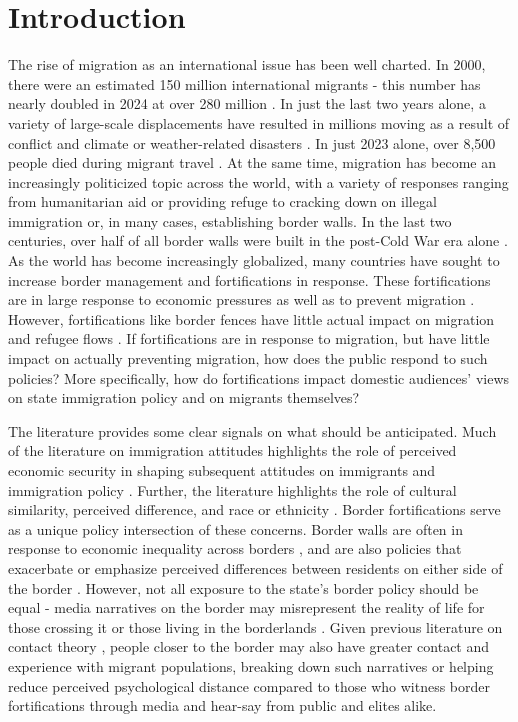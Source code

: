 \documentclass[12pt,]{article}
\begin{document}
\vskip 6.5pt


\noindent \doublespacing \section{Introduction}\label{introduction}

The rise of migration as an international issue has been well charted.
In 2000, there were an estimated 150 million international migrants -
this number has nearly doubled in 2024 at over 280 million
\citep{mcauliffe2024}. In just the last two years alone, a variety of
large-scale displacements have resulted in millions moving as a result
of conflict and climate or weather-related disasters
\citep{mcauliffe2024}. In just 2023 alone, over 8,500 people died during
migrant travel \citep{mcauliffe2024}. At the same time, migration has
become an increasingly politicized topic across the world, with a
variety of responses ranging from humanitarian aid or providing refuge
to cracking down on illegal immigration or, in many cases, establishing
border walls. In the last two centuries, over half of all border walls
were built in the post-Cold War era alone \citep{carter2017}. As the
world has become increasingly globalized, many countries have sought to
increase border management and fortifications in response. These
fortifications are in large response to economic pressures
\citep{carter2017} as well as to prevent migration \citep{avdan2023}.
However, fortifications like border fences have little actual impact on
migration and refugee flows \citep{avdan2023}. If fortifications are in
response to migration, but have little impact on actually preventing
migration, how does the public respond to such policies? More
specifically, how do fortifications impact domestic audiences' views on
state immigration policy and on migrants themselves?

The literature provides some clear signals on what should be
anticipated. Much of the literature on immigration attitudes highlights
the role of perceived economic security in shaping subsequent attitudes
on immigrants and immigration policy
\citep{arvanitidis2021, young2018, hoskin1983, binder1997, hoskin1983}.
Further, the literature highlights the role of cultural similarity,
perceived difference, and race or ethnicity
\citep{heath2020, heath2020a, burns2000, espenshade1993}. Border
fortifications serve as a unique policy intersection of these concerns.
Border walls are often in response to economic inequality across borders
\citep{carter2017}, and are also policies that exacerbate or emphasize
perceived differences between residents on either side of the border
\citep{mutz2022}. However, not all exposure to the state's border policy
should be equal - media narratives on the border may misrepresent the
reality of life for those crossing it or those living in the borderlands
\citep{jaramillo-dent2021}. Given previous literature on contact theory
\citep{pettigrew2006}, people closer to the border may also have greater
contact and experience with migrant populations, breaking down such
narratives or helping reduce perceived psychological distance compared
to those who witness border fortifications through media and hear-say
from public and elites alike.
\end{document}
